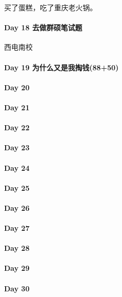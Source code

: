 \documentclass[UTF8,a4paper,8pt]{ctexart}
\begin{document}
	 	 
	 	 买了蛋糕，吃了重庆老火锅。
	 	 
 	 \paragraph{Day 18   去做群硕笔试题   \quad     }
	 	 西电南校
	 	 
 	 \paragraph{Day 19   为什么又是我掏钱(88+50)   \quad     }
 	 \paragraph{Day 20      \quad     }
 	 \paragraph{Day 21      \quad     }
 	 \paragraph{Day 22      \quad     }
 	 \paragraph{Day 23      \quad     }
 	 \paragraph{Day 24      \quad     }
 	 \paragraph{Day 25      \quad     }
 	 \paragraph{Day 26      \quad     }
 	 \paragraph{Day 27      \quad     }
 	 \paragraph{Day 28      \quad     }
 	 \paragraph{Day 29      \quad     }   
 	 \paragraph{Day 30      \quad     }
\end{document}
